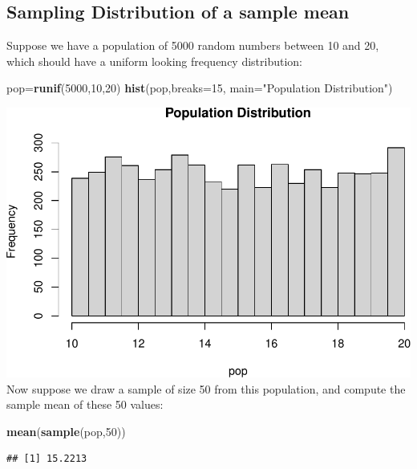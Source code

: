 \documentclass[
]{book}
\newenvironment{Shaded}{\begin{snugshade}}{\end{snugshade}}
\newcommand{\AttributeTok}[1]{\textcolor[rgb]{0.13,0.29,0.53}{#1}}
\newcommand{\DecValTok}[1]{\textcolor[rgb]{0.00,0.00,0.81}{#1}}
\newcommand{\FunctionTok}[1]{\textcolor[rgb]{0.13,0.29,0.53}{\textbf{#1}}}
\newcommand{\NormalTok}[1]{#1}
\newcommand{\OtherTok}[1]{\textcolor[rgb]{0.56,0.35,0.01}{#1}}
\newcommand{\StringTok}[1]{\textcolor[rgb]{0.31,0.60,0.02}{#1}}
\theoremstyle{definition}
\theoremstyle{definition}
\theoremstyle{definition}
\theoremstyle{definition}
\theoremstyle{remark}
\begin{document}
\subsection*{Sampling Distribution of a sample mean}\label{sampling-distribution-of-a-sample-mean}

Suppose we have a population of 5000 random numbers between 10 and 20, which should have a uniform looking frequency distribution:

\begin{Shaded}
\begin{Highlighting}[]
\NormalTok{pop}\OtherTok{=}\FunctionTok{runif}\NormalTok{(}\DecValTok{5000}\NormalTok{,}\DecValTok{10}\NormalTok{,}\DecValTok{20}\NormalTok{)}
\FunctionTok{hist}\NormalTok{(pop,}\AttributeTok{breaks=}\DecValTok{15}\NormalTok{, }\AttributeTok{main=}\StringTok{"Population Distribution"}\NormalTok{)}
\end{Highlighting}
\end{Shaded}

\includegraphics{math340-notes_files/figure-latex/unnamed-chunk-171-1.pdf}
Now suppose we draw a sample of size 50 from this population, and compute the sample mean of these 50 values:

\begin{Shaded}
\begin{Highlighting}[]
\FunctionTok{mean}\NormalTok{(}\FunctionTok{sample}\NormalTok{(pop,}\DecValTok{50}\NormalTok{))}
\end{Highlighting}
\end{Shaded}

\begin{verbatim}
## [1] 15.2213
\end{verbatim}
\end{document}
